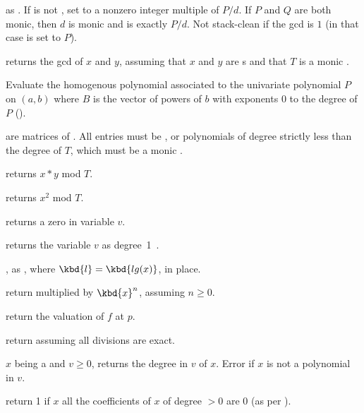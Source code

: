  as .
If  is not , set  to a nonzero integer
multiple of $P/d$. If $P$ and $Q$ are both monic, then $d$ is monic and
 is exactly $P/d$. Not stack-clean if the gcd is $1$
(in that case  is set to $P$).

 returns the gcd of $x$ and $y$,
assuming that $x$ and $y$ are s and that $T$ is a monic .

Evaluate the homogenous polynomial associated to the univariate polynomial
$P$ on $(a,b)$ where $B$ is the vector of powers of $b$ with exponents
$0$ to the degree of $P$ ().


 are matrices of . All entries must be ,  or
polynomials of degree strictly less than the degree of $T$, which must be a monic
.

 returns $x*y$ mod $T$.

 returns $x^2$ mod $T$.


 returns a zero  in variable $v$.

 returns the variable $v$ as degree~1~.

, as , where
$\kbd{l} = \kbd{lg(x)}$, in place.

 return 
multiplied by $\kbd{x}^n$, assuming $n\geq 0$.

 return the valuation of $f$ at $p$.

 return  assuming all divisions
are exact.



 $x$ being a  and $v \geq 0$,
returns the degree in $v$ of $x$. Error if $x$ is not a polynomial in $v$.

 return 1 if $x$ all the coefficients of
$x$ of degree $> 0$ are $0$ (as per ).

